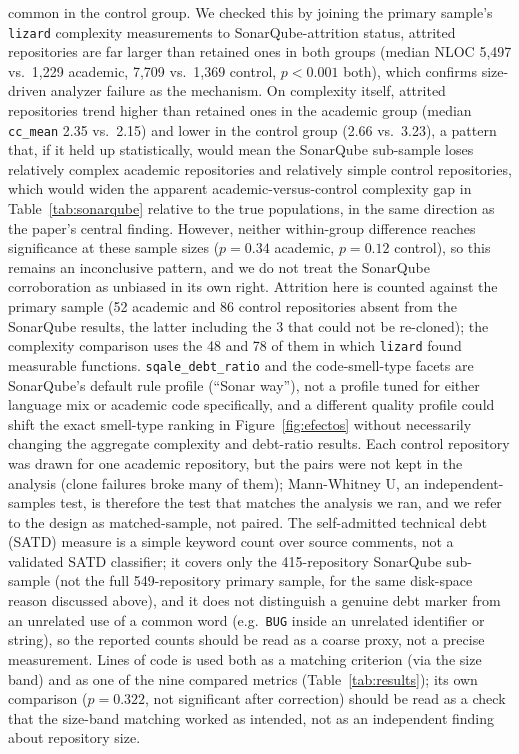 \documentclass{cleiej}
\begin{document}
common in the control group. We checked this by joining the primary sample's \texttt{lizard} complexity measurements to SonarQube-attrition status, attrited repositories are far larger than retained ones in both groups (median NLOC 5{,}497 vs.\ 1{,}229 academic, 7{,}709 vs.\ 1{,}369 control, $p<0.001$ both), which confirms size-driven analyzer failure as the mechanism. On complexity itself, attrited repositories trend higher than retained ones in the academic group (median \texttt{cc\_mean} 2.35 vs.\ 2.15) and lower in the control group (2.66 vs.\ 3.23), a pattern that, if it held up statistically, would mean the SonarQube sub-sample loses relatively complex academic repositories and relatively simple control repositories, which would widen the apparent academic-versus-control complexity gap in Table~\ref{tab:sonarqube} relative to the true populations, in the same direction as the paper's central finding. However, neither within-group difference reaches significance at these sample sizes ($p=0.34$ academic, $p=0.12$ control), so this remains an inconclusive pattern, and we do not treat the SonarQube corroboration as unbiased in its own right. Attrition here is counted against the primary sample (52 academic and 86 control repositories absent from the SonarQube results, the latter including the 3 that could not be re-cloned); the complexity comparison uses the 48 and 78 of them in which \texttt{lizard} found measurable functions. \texttt{sqale\_debt\_ratio} and the code-smell-type facets are SonarQube's default rule profile (``Sonar way''), not a profile tuned for either language mix or academic code specifically, and a different quality profile could shift the exact smell-type ranking in Figure~\ref{fig:efectos} without necessarily changing the aggregate complexity and debt-ratio results. Each control repository was drawn for one academic repository, but the pairs were not kept in the analysis (clone failures broke many of them); Mann-Whitney U, an independent-samples test, is therefore the test that matches the analysis we ran, and we refer to the design as matched-sample, not paired. The self-admitted technical debt (SATD) measure is a simple keyword count over source comments, not a validated SATD classifier; it covers only the 415-repository SonarQube sub-sample (not the full 549-repository primary sample, for the same disk-space reason discussed above), and it does not distinguish a genuine debt marker from an unrelated use of a common word (e.g.\ \texttt{BUG} inside an unrelated identifier or string), so the reported counts should be read as a coarse proxy, not a precise measurement. Lines of code is used both as a matching criterion (via the size band) and as one of the nine compared metrics (Table~\ref{tab:results}); its own comparison ($p=0.322$, not significant after correction) should be read as a check that the size-band matching worked as intended, not as an independent finding about repository size.
\end{document}
